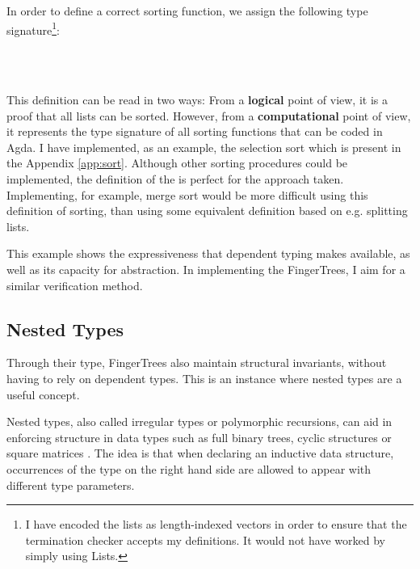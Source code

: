 \documentclass[12pt,twoside,notitlepage]{report}
\begin{document}
In order to define a correct sorting function, we assign the following type signature\footnote{I have encoded the lists as length-indexed vectors in order to ensure that the termination checker accepts my definitions. It would not have worked by simply using Lists.}:

\begin{code}
\\
\>[0]\<[2]%
\>[2] \AgdaSymbol{:}  \AgdaSymbol{\{} \AgdaSymbol{:} \AgdaSymbol{\}}  \AgdaSymbol{(} \AgdaSymbol{:}   \AgdaSymbol{)}  \AgdaSymbol{(} \AgdaSymbol{)}\<%
\\
\end{code}

This definition can be read in two ways: From a \textbf{logical} point of view, it is a proof that all lists can be sorted. However, from a \textbf{computational} point of view, it represents the type signature of all sorting functions that can be coded in Agda. I have implemented, as an example, the selection sort which is present in the Appendix \ref{app:sort}. Although other sorting procedures could be implemented, the definition of the  is perfect for the approach taken. Implementing, for example, merge sort would be more difficult using this definition of sorting, than using some equivalent definition based on e.g. splitting lists.

This example shows the expressiveness that dependent typing makes available, as well as its capacity for abstraction. In implementing the FingerTrees, I aim for a similar verification method.

\subsection{Nested Types}

Through their type, FingerTrees also maintain structural invariants, without having to rely on dependent types. This is an instance where nested types are a useful concept. 

Nested types\cite{nested}, also called irregular types or polymorphic recursions, can aid in enforcing structure in data types such as full binary trees, cyclic structures \cite{cyclic} or square matrices \cite{matrix}. The idea is that when declaring an inductive data structure, occurrences of the type on the right hand side are allowed to appear with different type parameters.
\end{document}
